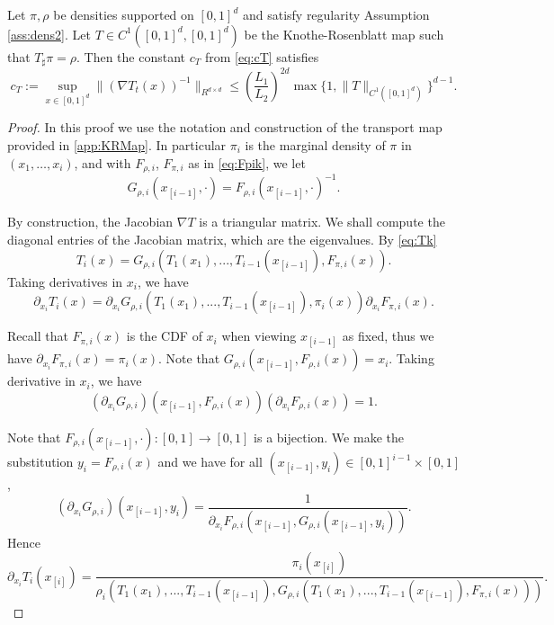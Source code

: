 \begin{lemma}\label{lemma:cT}
  Let $\pi, \rho$ be densities supported on $[0,1]^d$ and satisfy regularity Assumption \ref{ass:dens2}. Let $T\in C^1([0,1]^d, [0,1]^d)$ be the Knothe-Rosenblatt map such that $T_\sharp\pi = \rho$. Then
  the constant $c_T$ from \eqref{eq:cT} satisfies
  $$c_T := \sup_{x\in[0,1]^d}\|(\nabla T_t(x))^{-1}\|_{R^{d\times d}}
  \leq (\frac{L_1}{L_2})^{2d}\max\{1, \|T\|_{C^1([0,1]^d)}\}^{d-1}.$$
\end{lemma}
\begin{proof}
  In this proof we use the notation and construction of the transport map provided in \cref{app:KRMap}. In particular $\pi_i$ is the marginal density of $\pi$ in $(x_1,\dots,x_i)$, and with $F_{\rho,i}$, $F_{\pi,i}$ as in \eqref{eq:Fpik}, we let
    \begin{equation*}
      G_{\rho, i}(x_{[i-1]}, \cdot) = F_{\rho,i}(x_{[i-1]}, \cdot)^{-1}.
  \end{equation*}


  
  
  By %
  construction, the Jacobian $\nabla T$ is a triangular
  matrix. We shall compute the diagonal entries of the Jacobian
  matrix, which are the eigenvalues. %
  By \eqref{eq:Tk}
  $$T_i(x) = G_{\rho, i}(T_1(x_1),...,T_{i-1}(x_{[i-1]}), F_{\pi,
    i}(x)).$$ Taking derivatives in $x_i$, we have
$$\partial_{x_i}T_i(x) = \partial_{x_i}G_{\rho, i}(T_1(x_1),...,T_{i-1}(x_{[i-1]}), \pi_i(x))\partial_{x_i}F_{\pi,i}(x).$$

Recall that $F_{\pi,i}(x)$ is the CDF of $x_i$ when viewing
$x_{[i-1]}$ as fixed, thus we have
$\partial_{x_i}F_{\pi,i}(x) = \pi_i(x)$. Note that
$G_{\rho,i}(x_{[i-1]}, F_{\rho,i}(x)) = x_i$. Taking derivative in
$x_i$, we have
$$(\partial_{x_i}G_{\rho,i})(x_{[i-1]}, F_{\rho,i}(x))(\partial_{x_i}F_{\rho,i}(x)) = 1.$$

Note that $F_{\rho,i}(x_{[i-1]}, \cdot):[0,1]\rightarrow[0,1]$ is a
bijection. We make the substitution $y_i = F_{\rho,i}(x)$ and we have
for all $(x_{[i-1]}, y_i)\in[0,1]^{i-1}\times[0,1]$,
$$(\partial_{x_i}G_{\rho,i})(x_{[i-1]}, y_i) = \frac{1}{\partial_{x_i}F_{\rho,i}(x_{[i-1]}, G_{\rho,i}(x_{[i-1]}, y_i))}.$$
Hence
$$\partial_{x_i}T_i(x_{[i]}) = \frac{\pi_i(x_{[i]})}{\rho_i(T_1(x_1),...,T_{i-1}(x_{[i-1]}), G_{\rho,i}(T_1(x_1),...,T_{i-1}(x_{[i-1]}),F_{\pi,i}(x)))}.$$



\end{proof}
